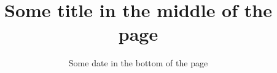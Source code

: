 \documentclass{beamer}
\title{Some title in the middle of the page}
\date{Some date in the bottom of the page}
\begin{document}
\frame{\titlepage}
\end{document}
